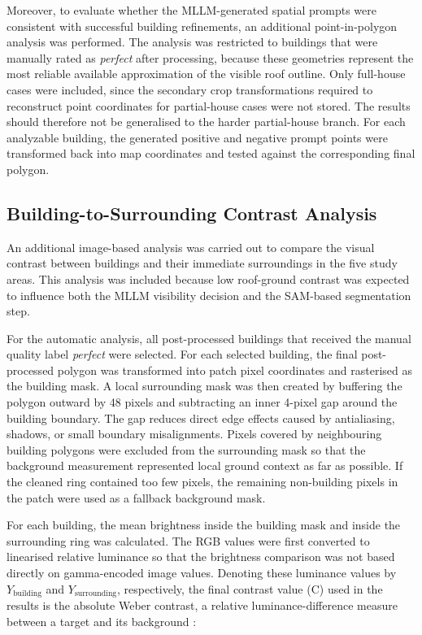 Moreover, to evaluate whether the MLLM-generated spatial prompts were consistent with successful building refinements, an additional point-in-polygon analysis was performed. The analysis was restricted to buildings that were manually rated as \textit{perfect} after processing, because these geometries represent the most reliable available approximation of the visible roof outline. Only full-house cases were included, since the secondary crop transformations required to reconstruct point coordinates for partial-house cases were not stored. The results should therefore not be generalised to the harder partial-house branch. For each analyzable building, the generated positive and negative prompt points were transformed back into map coordinates and tested against the corresponding final polygon.

\subsection{Building-to-Surrounding Contrast Analysis}
\label{sec:building_surrounding_contrast}

An additional image-based analysis was carried out to compare the visual contrast between buildings and their immediate surroundings in the five study areas. This analysis was included because low roof-ground contrast was expected to influence both the MLLM visibility decision and the SAM-based segmentation step.

For the automatic analysis, all post-processed buildings that received the manual quality label \textit{perfect} were selected. For each selected building, the final post-processed polygon was transformed into patch pixel coordinates and rasterised as the building mask. A local surrounding mask was then created by buffering the polygon outward by 48 pixels and subtracting an inner 4-pixel gap around the building boundary. The gap reduces direct edge effects caused by antialiasing, shadows, or small boundary misalignments. Pixels covered by neighbouring building polygons were excluded from the surrounding mask so that the background measurement represented local ground context as far as possible. If the cleaned ring contained too few pixels, the remaining non-building pixels in the patch were used as a fallback background mask.

For each building, the mean brightness inside the building mask and inside the surrounding ring was calculated. The RGB values were first converted to linearised relative luminance so that the brightness comparison was not based directly on gamma-encoded image values. Denoting these luminance values by $Y_{\mathrm{building}}$ and $Y_{\mathrm{surrounding}}$, respectively, the final contrast value (C) used in the results is the absolute Weber contrast, a relative luminance-difference measure between a target and its background \citep{PelliBex2013}:


